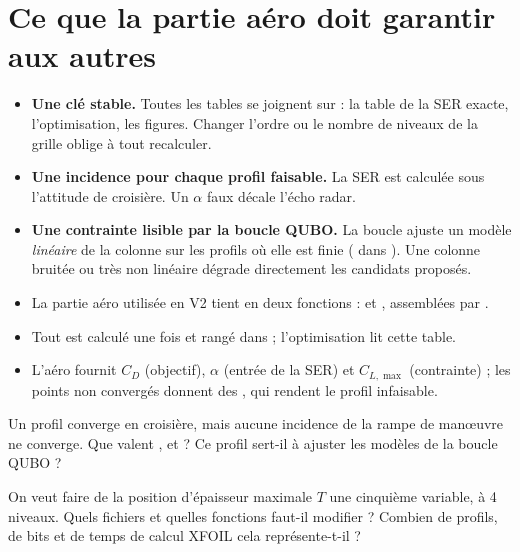\section{Ce que la partie aéro doit garantir aux autres}
\begin{itemize}
\item \textbf{Une clé stable.} Toutes les tables se joignent sur  : la table de la SER exacte, l'optimisation, les figures. Changer l'ordre ou le nombre de niveaux de la grille oblige à tout recalculer.
\item \textbf{Une incidence pour chaque profil faisable.} La SER est calculée sous l'attitude de croisière. Un $\alpha$ faux décale l'écho radar.
\item \textbf{Une contrainte lisible par la boucle QUBO.} La boucle ajuste un modèle \emph{linéaire} de la colonne  sur les profils où elle est finie ( dans ). Une colonne bruitée ou très non linéaire dégrade directement les candidats proposés.
\end{itemize}

\begin{resultat}
\begin{itemize}
\item La partie aéro utilisée en V2 tient en deux fonctions :  et , assemblées par .
\item Tout est calculé une fois et rangé dans  ; l'optimisation lit cette table.
\item L'aéro fournit $C_D$ (objectif), $\alpha$ (entrée de la SER) et $C_{L,\max}$ (contrainte) ; les points non convergés donnent des , qui rendent le profil infaisable.
\end{itemize}
\end{resultat}

\exercices
\begin{exercice}
Un profil converge en croisière, mais aucune incidence de la rampe de manœuvre ne converge. Que valent ,  et  ? Ce profil sert-il à ajuster les modèles de la boucle QUBO ?
\end{exercice}

\begin{exercice}
On veut faire de la position d'épaisseur maximale $T$ une cinquième variable, à 4 niveaux. Quels fichiers et quelles fonctions faut-il modifier ? Combien de profils, de bits et de temps de calcul XFOIL cela représente-t-il ?
\end{exercice}

